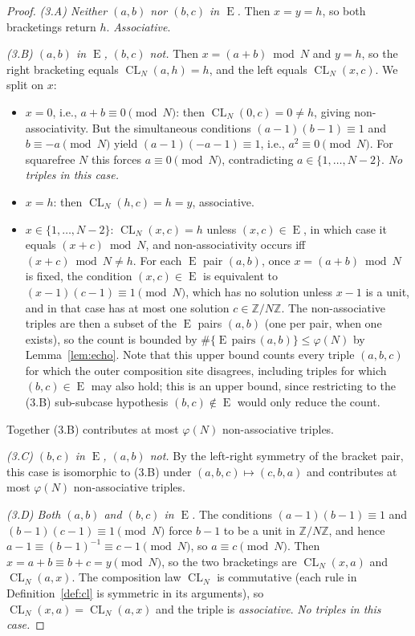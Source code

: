 \documentclass[11pt,reqno]{amsart}
\theoremstyle{plain}
\theoremstyle{definition}
\theoremstyle{remark}
\DeclareMathOperator{\CL}{CL}
\DeclareMathOperator{\ECHO}{E}
\newcommand{\ZN}{\mathbb{Z}/N\mathbb{Z}}
\begin{document}
\begin{proof}
\smallskip\noindent\textit{(3.A) Neither $(a,b)$ nor $(b,c)$ in $\ECHO$.}
Then $x=y=h$, so both bracketings return $h$. \emph{Associative}.

\smallskip\noindent\textit{(3.B) $(a,b)$ in $\ECHO$, $(b,c)$ not.}
Then $x=(a+b)\bmod N$ and $y=h$, so the right bracketing equals
$\CL_N(a,h)=h$, and the left equals $\CL_N(x,c)$. We split on $x$:
\begin{itemize}\setlength\itemsep{0pt}
\item $x=0$, i.e., $a+b\equiv 0\pmod N$: then $\CL_N(0,c)=0\neq h$,
giving non-associativity. But the simultaneous conditions
$(a-1)(b-1)\equiv 1$ and $b\equiv -a\pmod N$ yield
$(a-1)(-a-1)\equiv 1$, i.e., $a^{2}\equiv 0\pmod N$. For squarefree
$N$ this forces $a\equiv 0\pmod N$, contradicting
$a\in\{1,\dots,N-2\}$. \emph{No triples in this case.}
\item $x=h$: then $\CL_N(h,c)=h=y$, associative.
\item $x\in\{1,\dots,N-2\}$: $\CL_N(x,c)=h$ unless $(x,c)\in\ECHO$,
in which case it equals $(x+c)\bmod N$, and non-associativity
occurs iff $(x+c)\bmod N\neq h$. For each $\ECHO$ pair $(a,b)$,
once $x=(a+b)\bmod N$ is fixed, the condition $(x,c)\in\ECHO$ is
equivalent to $(x-1)(c-1)\equiv 1\pmod N$, which has no solution
unless $x-1$ is a unit, and in that case has at most one solution
$c\in\ZN$. The non-associative triples are then a subset of the
$\ECHO$ pairs $(a,b)$ (one per pair, when one exists), so the
count is bounded by $\#\{\ECHO\,\text{pairs}\,(a,b)\} \le \varphi(N)$
by Lemma~\ref{lem:echo}. Note that this upper bound counts every
triple $(a,b,c)$ for which the outer composition site disagrees,
including triples for which $(b,c)\in\ECHO$ may also hold; this is
an upper bound, since restricting to the (3.B) sub-subcase
hypothesis $(b,c)\notin\ECHO$ would only reduce the count.
\end{itemize}
Together (3.B) contributes at most $\varphi(N)$ non-associative
triples.

\smallskip\noindent\textit{(3.C) $(b,c)$ in $\ECHO$, $(a,b)$ not.}
By the left-right symmetry of the bracket pair, this case is
isomorphic to (3.B) under $(a,b,c)\mapsto(c,b,a)$ and contributes
at most $\varphi(N)$ non-associative triples.

\smallskip\noindent\textit{(3.D) Both $(a,b)$ and $(b,c)$ in $\ECHO$.}
The conditions $(a-1)(b-1)\equiv 1$ and $(b-1)(c-1)\equiv 1\pmod N$
force $b-1$ to be a unit in $\ZN$, and hence
$a-1\equiv(b-1)^{-1}\equiv c-1\pmod N$, so $a\equiv c\pmod N$. Then
$x=a+b\equiv b+c=y\pmod N$, so the two bracketings are
$\CL_N(x,a)$ and $\CL_N(a,x)$. The composition law $\CL_N$ is
commutative (each rule in Definition~\ref{def:cl} is symmetric in
its arguments), so $\CL_N(x,a)=\CL_N(a,x)$ and the triple is
\emph{associative}. \emph{No triples in this case.}


\end{proof}
\end{document}
